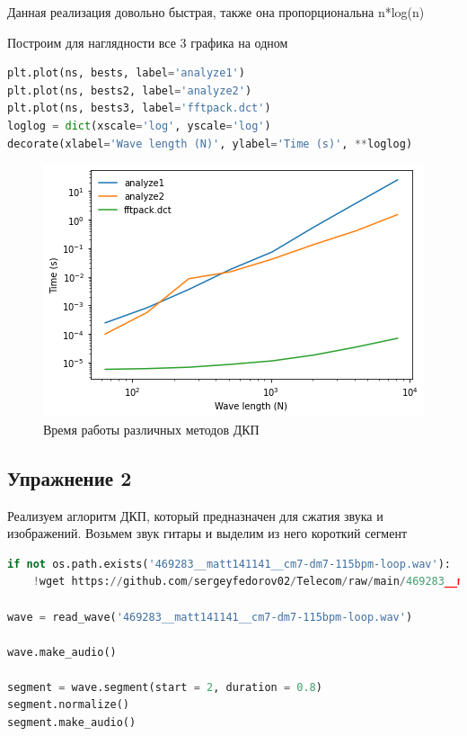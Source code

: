 Данная реализация довольно быстрая, также она пропорциональна n*log(n)

Построим для наглядности все 3 графика на одном

\begin{lstlisting}[language=Python]
plt.plot(ns, bests, label='analyze1')
plt.plot(ns, bests2, label='analyze2')
plt.plot(ns, bests3, label='fftpack.dct')
loglog = dict(xscale='log', yscale='log')
decorate(xlabel='Wave length (N)', ylabel='Time (s)', **loglog)
\end{lstlisting}

\begin{figure}[H]
	\begin{center}
		\includegraphics[scale=1]{fig/lab06/lab06_04.png}
		\caption{Время работы различных методов ДКП}
	\end{center}
\end{figure}


\subsection{Упражнение 2}

Реализуем аглоритм ДКП, который предназначен для сжатия звука и изображений. Возьмем звук гитары и выделим из него короткий сегмент

\begin{lstlisting}[language=Python]
if not os.path.exists('469283__matt141141__cm7-dm7-115bpm-loop.wav'):
    !wget https://github.com/sergeyfedorov02/Telecom/raw/main/469283__matt141141__cm7-dm7-115bpm-loop.wav

wave = read_wave('469283__matt141141__cm7-dm7-115bpm-loop.wav')

wave.make_audio()

segment = wave.segment(start = 2, duration = 0.8)
segment.normalize()
segment.make_audio()
\end{lstlisting}

